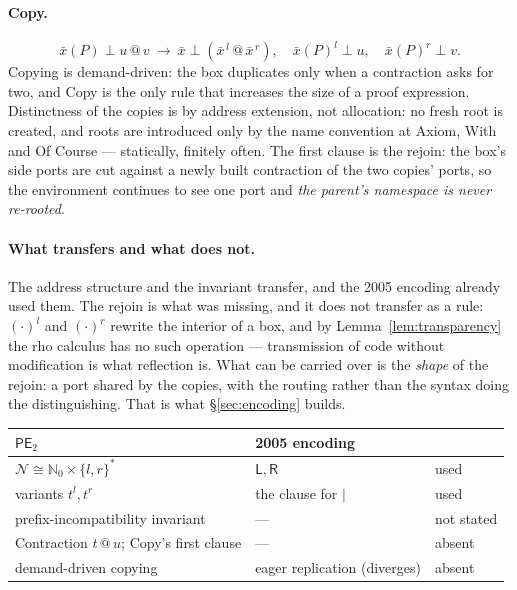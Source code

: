 \documentclass[11pt]{article}
\theoremstyle{definition}
\theoremstyle{plain}
\theoremstyle{remark}
\newcommand{\Lft}{\mathsf{L}}
\newcommand{\Rgt}{\mathsf{R}}
\begin{document}
\paragraph{Copy.}
\[
  \bar x(P) \perp u \mathbin{@} v
  \ \longrightarrow\
  \bar x \perp (\bar x^{\,l} \mathbin{@} \bar x^{\,r}),\quad
  \bar x(P)^l \perp u,\quad
  \bar x(P)^r \perp v .
\]
Copying is demand-driven: the box duplicates only when a contraction asks
for two, and Copy is the only rule that increases the size of a proof
expression. Distinctness of the copies is by address extension, not
allocation: no fresh root is created, and roots are introduced only by the
name convention at Axiom, With and Of Course --- statically, finitely
often. The first clause is the rejoin: the box's side ports are cut
against a newly built contraction of the two copies' ports, so the
environment continues to see one port and \emph{the parent's namespace is
never re-rooted}.

\paragraph{What transfers and what does not.}
The address structure and the invariant transfer, and the 2005 encoding
already used them. The rejoin is what was missing, and it does not
transfer as a rule: $(\cdot)^l$ and $(\cdot)^r$ rewrite the interior of a
box, and by Lemma~\ref{lem:transparency} the rho calculus has no such
operation --- transmission of code without modification is what reflection
is. What can be carried over is the \emph{shape} of the rejoin: a port
shared by the copies, with the routing rather than the syntax doing the
distinguishing. That is what \S\ref{sec:encoding} builds.

\begin{center}
\begin{tabular}{@{}lll@{}}
\toprule
$\mathsf{PE}_2$ & 2005 encoding & \\
\midrule
$\mathcal{N} \cong \mathbb{N}_0 \times \{l,r\}^*$ & $\Lft, \Rgt$ & used \\
variants $t^l, t^r$ & the clause for $\mid$ & used \\
prefix-incompatibility invariant & --- & not stated \\
Contraction $t \mathbin{@} u$; Copy's first clause & --- & absent \\
demand-driven copying & eager replication (diverges) & absent \\
\bottomrule
\end{tabular}
\end{center}
\end{document}
